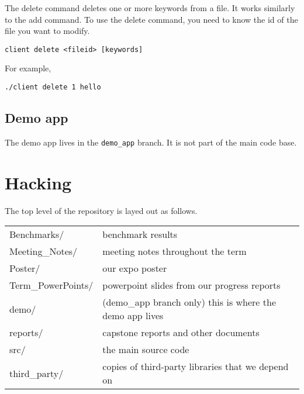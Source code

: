 
The delete command deletes one or more keywords from a file.
It works similarly to the add command.
To use the delete command, you need to know the id of the file you want to modify.

\begin{lstlisting}
client delete <fileid> [keywords]
\end{lstlisting}

For example,

\begin{lstlisting}
./client delete 1 hello
\end{lstlisting}

\subsection{Demo app}

The demo app lives in the \texttt{demo_app} branch.
It is not part of the main code base.


\section{Hacking}

The top level of the repository is layed out as follows.

\begin{tabular}{ll}
    Benchmarks/         & benchmark results \\
    Meeting_Notes/      & meeting notes throughout the term \\
    Poster/             & our expo poster \\
    Term_PowerPoints/   & powerpoint slides from our progress reports \\
    demo/               & (demo_app branch only) this is where the demo app lives \\
    reports/            & capstone reports and other documents \\
    src/                & the main source code \\
    third_party/        & copies of third-party libraries that we depend on \\
\end{tabular}


